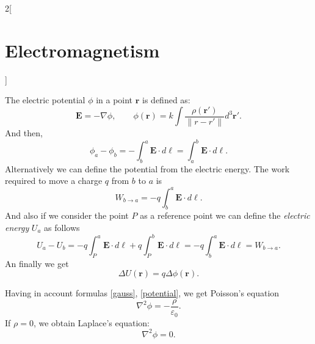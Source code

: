 \documentclass[class=article,10pt,crop=false]{standalone}
\begin{document}
\begin{multicols}{2}[\section{Electromagnetism}]
\begin{concept}
The electric potential $\phi$ in a point $\textbf{r}$ is defined as: \begin{equation}
    \textbf{E}=-\nabla\phi,\qquad\phi(\textbf{r})=k\int\frac{\rho(\textbf{r}')}{\|r-r'\|}d^3\textbf{r}'.
    \label{potential}
\end{equation} And then, $$\phi_a-\phi_b=-\int_b^a\textbf{E}\cdot d\ell=\int_a^b\textbf{E}\cdot d\ell.$$ Alternatively we can define the potential from the electric energy. The work required to move a charge $q$ from $b$ to $a$ is $$W_{b\to a}=-q\int_b^a\textbf{E}\cdot d\ell.$$ And also if we consider the point $P$ as a reference point we can define the \textit{electric energy} $U_a$ as follows $$U_a-U_b=-q\int_P^a\textbf{E}\cdot d\ell+q\int_P^b\textbf{E}\cdot d\ell=-q\int_b^a\textbf{E}\cdot d\ell=W_{b\to a}.$$ An finally we get $$\Delta U(\textbf{r})=q\Delta\phi(\textbf{r}).$$
\end{concept}
\begin{concept}
Having in account formulas \ref{gauss}, \ref{potential}, we get Poisson's equation $$\nabla^2\phi=-\frac{\rho}{\varepsilon_0}.$$ If $\rho=0$, we obtain Laplace's equation: $$\nabla^2\phi=0.$$
\end{concept}
\end{multicols}
\end{document}
